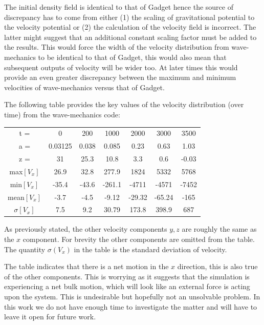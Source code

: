 The initial density field is identical to that of Gadget hence the source of discrepancy has to come from either (1) the scaling of gravitational potential to the velocity potential or (2) the calculation of the velocity field is incorrect. The latter might suggest that an additional constant scaling factor must be added to the results. This would force the width of the velocity distribution from wave-mechanics to be identical to that of Gadget, this would also mean that subsequent outputs of velocity will be wider too. At later times this would provide an even greater discrepancy between the maximum and minimum velocities of wave-mechanics versus that of Gadget.


The following table provides the key values of the velocity distribution (over time) from the wave-mechanics code:

\vspace*{1cm}
\begin{center}
\begin{tabular}{|c|c|c|c|c|c|c|}
  \hline
  t = & 0 & 200 & 1000 & 2000 & 3000 & 3500 \\
  a = & 0.03125 & 0.038 & 0.085 & 0.23 & 0.63 & 1.03 \\
  z = & 31 & 25.3 & 10.8 & 3.3 & 0.6 & -0.03 \\  \hline
  max$[V_x]$ & 26.9 & 32.8& 277.9& 1824& 5332& 5768 \\
  min$[V_x]$ & -35.4&-43.6&-261.1&-4711&-4571& -7452 \\
  mean$[V_x]$ & -3.7&-4.5 &-9.12 &-29.32&-65.24&-165  \\
  $\sigma[V_x]$ & 7.5&9.2 &30.79 &173.8& 398.9& 687 \\
  \hline
\end{tabular}
\end{center}
\vspace*{1cm}

\noindent As previously stated, the other velocity components $y, z$ are roughly the same as the $x$ component. For brevity the other components are omitted from the table. The quantity $\sigma(V_x)$ in the table is the standard deviation of velocity.

The table indicates that there is a net motion in the $x$ direction, this is also true of the other components. This is worrying as it suggests that the simulation is experiencing a net bulk motion, which will look like an external force is acting upon the system. This is undesirable but hopefully not an unsolvable problem. In this work we do not have enough time to investigate the matter and will have to leave it open for future work.


